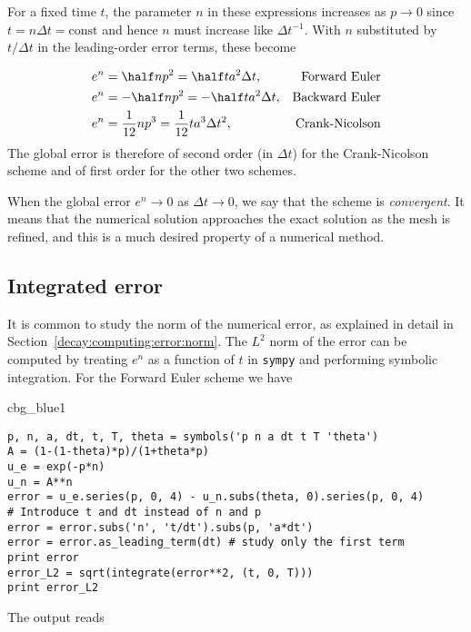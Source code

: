 \documentclass[graybox,sectrefs,envcountresetchap,open=right,final]{svmonodo}
\newenvironment{_cod_tight}[1]{
   \def\FrameCommand{\colorbox{#1}}
   \FrameRule0.6pt\MakeFramed {\FrameRestore}\vskip3mm}
   {\vskip0mm\endMakeFramed}
\newenvironment{cod}[1]{
\bgroup\rmfamily
\fboxsep=0mm\relax
\begin{_cod_tight}{#1}
\list{}{\parsep=-2mm\parskip=0mm\topsep=0pt\leftmargin=2mm
\rightmargin=2\leftmargin\leftmargin=4pt\relax}
\item\relax}
{\endlist\end{_cod_tight}\egroup}
\newenvironment{notice_mdfboxadmon}[1][]{
\begin{notice_mdfboxmdframed}[frametitle=#1]
}
{
\end{notice_mdfboxmdframed}
}
\begin{document}
For a fixed time $t$, the parameter $n$ in these expressions increases
as $p\rightarrow 0$ since $t=n\Delta t =\mbox{const}$ and hence
$n$ must increase like $\Delta t^{-1}$. With $n$ substituted by
$t/\Delta t$ in
the leading-order error terms, these become

\begin{align}
e^n &= \half n p^2 = {\half}ta^2\Delta t, &\hbox{Forward Euler}
\label{decay:analysis:gobal:error:FE}\\ 
e^n &= -\half n p^2 = -{\half}ta^2\Delta t, &\hbox{Backward Euler}
\label{decay:analysis:gobal:error:BE}\\ 
e^n &= \frac{1}{12}np^3 = \frac{1}{12}ta^3\Delta t^2, &\hbox{Crank-Nicolson}
\label{decay:analysis:gobal:error:CN}
\end{align}
The global error is therefore of
second order (in $\Delta t$) for the Crank-Nicolson scheme and of
first order for the other two schemes.


\begin{notice_mdfboxadmon}[Convergence]
When the global error $e^n\rightarrow 0$ as $\Delta t\rightarrow 0$,
we say that the scheme is \emph{convergent}. It means that the numerical
solution approaches the exact solution as the mesh is refined, and
this is a much desired property of a numerical method.
\end{notice_mdfboxadmon}



\subsection{Integrated error}
\label{decay:analysis:gobal:error_int}

It is common to study the norm of the numerical error, as
explained in detail in Section~\ref{decay:computing:error:norm}.
The $L^2$ norm of the error can be computed by treating $e^n$ as a function
of $t$ in \texttt{sympy} and performing symbolic integration. For
the Forward Euler scheme we have

\begin{cod}{cbg_blue1}\begin{Verbatim}[numbers=none,fontsize=\fontsize{9pt}{9pt},baselinestretch=0.95,xleftmargin=2mm]
p, n, a, dt, t, T, theta = symbols('p n a dt t T 'theta')
A = (1-(1-theta)*p)/(1+theta*p)
u_e = exp(-p*n)
u_n = A**n
error = u_e.series(p, 0, 4) - u_n.subs(theta, 0).series(p, 0, 4)
# Introduce t and dt instead of n and p
error = error.subs('n', 't/dt').subs(p, 'a*dt')
error = error.as_leading_term(dt) # study only the first term
print error
error_L2 = sqrt(integrate(error**2, (t, 0, T)))
print error_L2
\end{Verbatim}
\end{cod}
\noindent
The output reads
\end{document}
